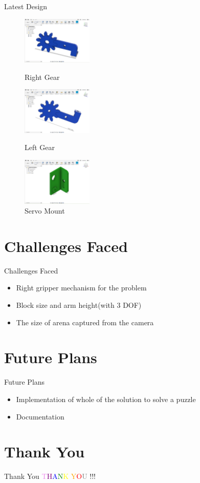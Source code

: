 \documentclass[10pt,a4paper]{beamer}
\begin{document}
\begin{frame}{Latest Design}
\begin{figure}
\includegraphics[height=0.2\textheight, width=0.3\textwidth]{gear1.png}\caption{Right Gear}\includegraphics[height=0.2\textheight, width=0.3\textwidth]{gear2.png}\caption{Left Gear}
\includegraphics[height=0.2\textheight, width=0.3\textwidth]{plate.png}\caption{Servo Mount}
\end{figure}
\end{frame}
\section{Challenges Faced}
\begin{frame}{Challenges Faced}
	\begin{itemize}
	\color{red}
		\item Right gripper mechanism for the problem
		\item Block size and arm height(with 3 DOF) 
		\item The size of arena captured from the camera 
	\end{itemize}
\end{frame}

\section{Future Plans}
\begin{frame}{Future Plans}
	\begin{itemize}
	\color{violet}
		\item Implementation of whole of the solution to solve a puzzle
		\item Documentation
	\end{itemize}
\end{frame}


\section{Thank You}
\begin{frame}{Thank You}
	\centering\textcolor{violet} T\textcolor{purple}H\textcolor{blue}A\textcolor{green}N\textcolor{yellow}K \textcolor{orange}Y\textcolor{red}O\textcolor{gray}U !!!
\end{frame}
\end{document}
